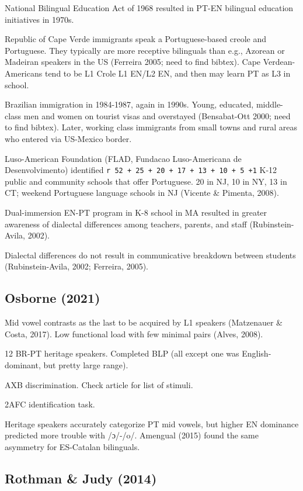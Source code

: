 \documentclass[
  letterpaper,
  DIV=11,
  numbers=noendperiod]{scrartcl}
\begin{document}
National Bilingual Education Act of 1968 resulted in PT-EN bilingual
education initiatives in 1970s.

Republic of Cape Verde immigrants speak a Portuguese-based creole and
Portuguese. They typically are more receptive bilinguals than e.g.,
Azorean or Madeiran speakers in the US (Ferreira 2005; need to find
bibtex). Cape Verdean-Americans tend to be L1 Crole L1 EN/L2 EN, and
then may learn PT as L3 in school.

Brazilian immigration in 1984-1987, again in 1990s. Young, educated,
middle-class men and women on tourist visas and overstayed (Bensabat-Ott
2000; need to find bibtex). Later, working class immigrants from small
towns and rural areas who entered via US-Mexico border.

Luso-American Foundation (FLAD, Fundacao Luso-Americana de
Desenvolvimento) identified
\texttt{r\ 52\ +\ 25\ +\ 20\ +\ 17\ +\ 13\ +\ 10\ +\ 5\ +1} K-12 public
and community schools that offer Portuguese. 20 in NJ, 10 in NY, 13 in
CT; weekend Portuguese language schools in NJ (Vicente \& Pimenta,
2008).

Dual-immersion EN-PT program in K-8 school in MA resulted in greater
awareness of dialectal differences among teachers, parents, and staff
(Rubinstein-Avila, 2002).

Dialectal differences do not result in communicative breakdown between
students (Rubinstein-Avila, 2002; Ferreira, 2005).

\subsection{Osborne (2021)}\label{osborne2021perception}

Mid vowel contrasts as the last to be acquired by L1 speakers
(Matzenauer \& Costa, 2017). Low functional load with few minimal pairs
(Alves, 2008).

12 BR-PT heritage speakers. Completed BLP (all except one was
English-dominant, but pretty large range).

AXB discrimination. Check article for list of stimuli.

2AFC identification task.

Heritage speakers accurately categorize PT mid vowels, but higher EN
dominance predicted more trouble with /ɔ/-/o/. Amengual (2015) found the
same asymmetry for ES-Catalan bilinguals.

\subsection{Rothman \& Judy (2014)}\label{rothman2014portuguese}
\end{document}
